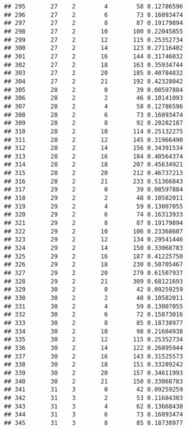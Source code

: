 \documentclass[
]{article}
\begin{document}
\begin{verbatim}
## 295       27    2        4        58 0.12786596
## 296       27    2        6        73 0.16093474
## 297       27    2        8        87 0.19179894
## 298       27    2       10       100 0.22045855
## 299       27    2       12       115 0.25352734
## 300       27    2       14       123 0.27116402
## 301       27    2       16       144 0.31746032
## 302       27    2       18       163 0.35934744
## 303       27    2       20       185 0.40784832
## 304       27    2       21       192 0.42328042
## 305       28    2        0        39 0.08597884
## 306       28    2        2        46 0.10141093
## 307       28    2        4        58 0.12786596
## 308       28    2        6        73 0.16093474
## 309       28    2        8        92 0.20282187
## 310       28    2       10       114 0.25132275
## 311       28    2       12       145 0.31966490
## 312       28    2       14       156 0.34391534
## 313       28    2       16       184 0.40564374
## 314       28    2       18       207 0.45634921
## 315       28    2       20       212 0.46737213
## 316       28    2       21       233 0.51366843
## 317       29    2        0        39 0.08597884
## 318       29    2        2        48 0.10582011
## 319       29    2        4        59 0.13007055
## 320       29    2        6        74 0.16313933
## 321       29    2        8        87 0.19179894
## 322       29    2       10       106 0.23368607
## 323       29    2       12       134 0.29541446
## 324       29    2       14       150 0.33068783
## 325       29    2       16       187 0.41225750
## 326       29    2       18       230 0.50705467
## 327       29    2       20       279 0.61507937
## 328       29    2       21       309 0.68121693
## 329       30    2        0        42 0.09259259
## 330       30    2        2        48 0.10582011
## 331       30    2        4        59 0.13007055
## 332       30    2        6        72 0.15873016
## 333       30    2        8        85 0.18738977
## 334       30    2       10        98 0.21604938
## 335       30    2       12       115 0.25352734
## 336       30    2       14       122 0.26895944
## 337       30    2       16       143 0.31525573
## 338       30    2       18       151 0.33289242
## 339       30    2       20       157 0.34611993
## 340       30    2       21       150 0.33068783
## 341       31    3        0        42 0.09259259
## 342       31    3        2        53 0.11684303
## 343       31    3        4        62 0.13668430
## 344       31    3        6        73 0.16093474
## 345       31    3        8        85 0.18738977

\end{verbatim}
\end{document}
